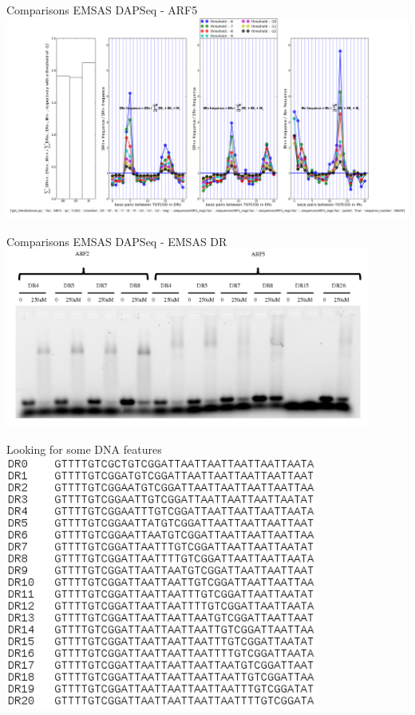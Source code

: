 \documentclass{beamer}
\begin{document}
\begin{frame}{Comparisons EMSAS DAPSeq - ARF5}
  \includegraphics[width=1\textwidth,height=0.8\textheight,center]{ARF5_interdistances_-6-7-8-9-10-11-12_points_4Neg.png}
\end{frame}

\begin{frame}{Comparisons EMSAS DAPSeq - EMSAS DR}
  \includegraphics[width=0.9\textwidth,height=0.8\textheight,center]{EMSA_DR.png}
\end{frame}

\begin{frame}{Looking for some DNA features}
  \includegraphics[width=0.77\textwidth,height=0.7\textheight,center]{tableau_DR.png}
\end{frame}
\end{document}

